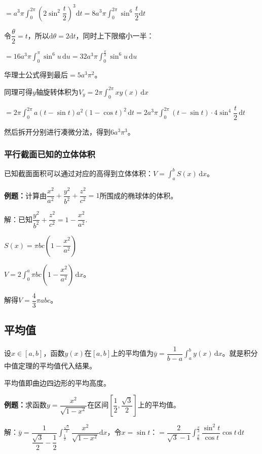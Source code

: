 \documentclass[UTF8, 12pt]{ctexart}
\begin{document}
$=a^3\pi\displaystyle{\int_0^{2\pi}\left(2\sin^2\dfrac{t}{2}\right)^3\textrm{d}t}=8a^3\pi\displaystyle{\int_0^{2\pi}\sin^6\dfrac{t}{2}\textrm{d}t}$

令$\dfrac{\theta}{2}=t$，所以$\textrm{d}\theta=2\textrm{d}t$，同时上下限缩小一半：

$=16a^3\pi\int_0^\pi\sin^6u\,\textrm{d}u=32a^3\pi\int_0^{\frac{\pi}{2}}\sin^6u\,\textrm{d}u$

华理士公式得到最后$=5a^3\pi^2$。

同理可得$y$轴旋转体积为$V_y=2\pi\int_0^{2\pi}xy(x)\,\textrm{d}x$

$=2\pi\int_0^{2\pi}a(t-\sin t)a^2(1-\cos t)^2\,\textrm{d}t=2a^3\pi\int_0^{2\pi}(t-\sin t)\cdot 4\sin^4\dfrac{t}{2}\,\textrm{d}t$

然后拆开分别进行凑微分法，得到$6a^3\pi^3$。

\subsubsection{平行截面已知的立体体积}

已知截面面积可以通过对应的高得到立体体积：$V=\int_a^bS(x)\,\textrm{d}x$。

\textbf{例题：}计算由$\dfrac{x^2}{a^2}+\dfrac{y^2}{b^2}+\dfrac{z^2}{c^2}=1$所围成的椭球体的体积。

解：已知$\dfrac{y^2}{b^2}+\dfrac{z^2}{c^2}=1-\dfrac{x^2}{a^2}$.

$S(x)=\pi bc\left(1-\dfrac{x^2}{a^2}\right)$

$V=2\int_0^a\pi bc\left(1-\dfrac{x^2}{a^2}\right)\,\textrm{d}x$。

解得$V=\dfrac{4}{3}\pi abc$。

\subsection{平均值}

设$x\in[a,b]$，函数$y(x)$在$[a,b]$上的平均值为$\bar{y}=\dfrac{1}{b-a}\int_a^by(x)\,\textrm{d}x$。就是积分中值定理的平均值代入结果。

平均值即曲边四边形的平均高度。

\textbf{例题：}求函数$y=\dfrac{x^2}{\sqrt{1-x^2}}$在区间$\left[\dfrac{1}{2},\dfrac{\sqrt{3}}{2}\right]$上的平均值。

解：$\bar{y}=\dfrac{1}{\dfrac{\sqrt{3}}{2}-\dfrac{1}{2}}\displaystyle{\int_\frac{1}{2}^\frac{\sqrt{3}}{2}\dfrac{x^2}{\sqrt{1-x^2}}\textrm{d}x}$，令$x=\sin t$：$=\dfrac{2}{\sqrt{3}-1}\displaystyle{\int_\frac{\pi}{6}^\frac{\pi}{3}\dfrac{\sin^2t}{\cos t}\cos t\,\textrm{d}t}$ \medskip
\end{document}

